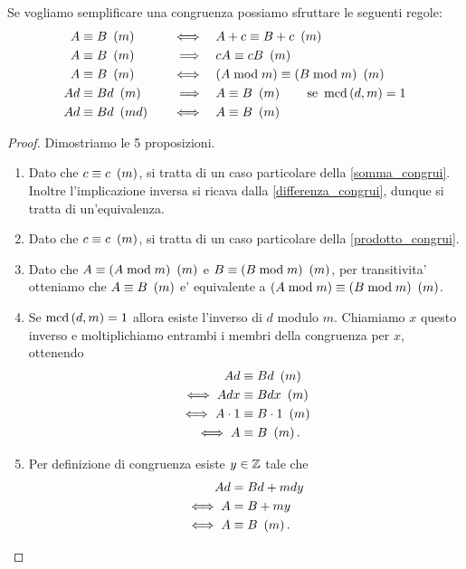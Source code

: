 \begin{proposition}
    Se vogliamo semplificare una congruenza possiamo sfruttare le seguenti regole:
    \begin{alignat}{3}
        A &\equiv B \ \left(m\right) \quad &\iff      \quad &A + c \equiv B + c \ \left(m\right) \\
        A &\equiv B \ \left(m\right) \quad &\implies  \quad &cA \equiv cB \ \left(m\right) \\
        A &\equiv B \ \left(m\right) \quad &\iff      \quad &(A \bmod m) \equiv (B \bmod m) \ \left(m\right) \\
        Ad &\equiv Bd \ \left(m\right) \quad &\implies\quad &A \equiv B \ \left(m\right) \qquad \text{se }\operatorname{mcd}\left(d, m\right) = 1\\
        Ad &\equiv Bd \ \left(md\right) \quad &\iff   \quad &A \equiv B \ \left(m\right)
    \end{alignat}
\end{proposition}
\begin{proof}
    Dimostriamo le 5 proposizioni.
    \begin{enumerate}
        \item Dato che $c \equiv c \ \left(m\right)$, si tratta di un caso particolare della \ref{somma_congrui}. Inoltre l'implicazione inversa si ricava dalla \ref{differenza_congrui}, dunque si tratta di un'equivalenza.
        \item Dato che $c \equiv c \ \left(m\right)$, si tratta di un caso particolare della \ref{prodotto_congrui}.
        \item Dato che $A \equiv (A \bmod m) \ \left(m\right)$ e $B \equiv (B \bmod m) \ \left(m\right)$, per transitivita' otteniamo che $A \equiv B \ \left(m\right)$ e' equivalente a $(A \bmod m) \equiv (B \bmod m) \ \left(m\right)$.
        \item Se $\operatorname{mcd}\left(d, m\right) = 1$ allora esiste l'inverso di $d$ modulo $m$. Chiamiamo $x$ questo inverso e moltiplichiamo entrambi i membri della congruenza per $x$, ottenendo
        \begin{alignat*}
            {1}
            Ad &\equiv Bd \ \left(m\right)  \\
            \iff Adx &\equiv Bdx \ \left(m\right) \\
            \iff A \cdot 1 &\equiv B \cdot 1 \ \left(m\right) \\
            \iff A &\equiv B \ \left(m\right).
        \end{alignat*}
        \item Per definizione di congruenza esiste $y \in \mathbb{Z}$ tale che
        \begin{alignat*}
            {1}
            Ad &= Bd + mdy \\
            \iff A &= B + my \\
            \iff A &\equiv B \ \left(m\right).
        \end{alignat*}
    \end{enumerate}
\end{proof}

